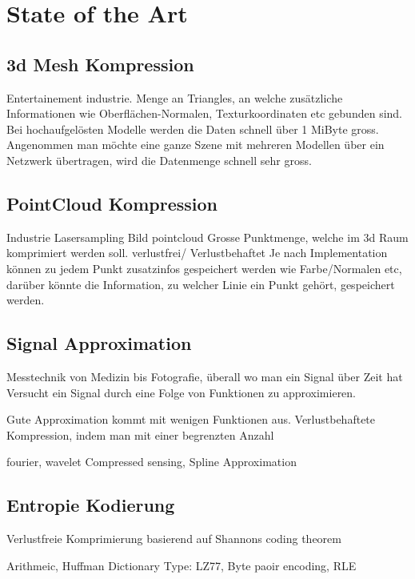 \section{State of the Art}

\subsection{3d Mesh Kompression}

Entertainement industrie. Menge an Triangles, an welche zusätzliche Informationen wie Oberflächen-Normalen, Texturkoordinaten etc gebunden sind. Bei hochaufgelösten Modelle werden die Daten schnell über 1 MiByte gross. Angenommen man möchte eine ganze Szene mit mehreren Modellen über ein Netzwerk übertragen, wird die Datenmenge schnell sehr gross.

\subsection{PointCloud Kompression}
Industrie Lasersampling
Bild pointcloud
Grosse Punktmenge, welche im 3d Raum komprimiert werden soll.
verlustfrei/ Verlustbehaftet
Je nach Implementation können zu jedem Punkt zusatzinfos gespeichert werden wie Farbe/Normalen etc, darüber könnte die Information, zu welcher Linie ein Punkt gehört, gespeichert werden.

\subsection{Signal Approximation}
Messtechnik von Medizin bis Fotografie, überall wo man ein Signal über Zeit hat
Versucht ein Signal durch eine Folge von Funktionen zu approximieren.

Gute Approximation kommt mit wenigen Funktionen aus.
Verlustbehaftete Kompression, indem man mit einer begrenzten Anzahl

fourier, wavelet Compressed sensing, Spline Approximation

\subsection{Entropie Kodierung}
Verlustfreie Komprimierung basierend auf Shannons coding theorem

 Arithmeic, Huffman
Dictionary Type: LZ77, Byte paoir encoding, RLE
